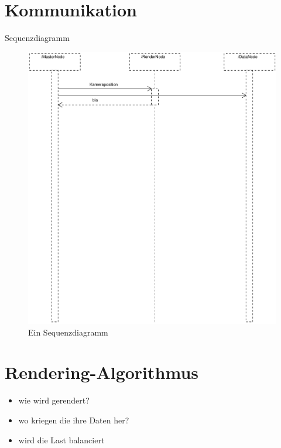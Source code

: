 \section{Kommunikation}
\label{impl:kommunikation}
Sequenzdiagramm
\begin{figure}
 \centering
  \includegraphics[scale=0.5]{images/Sequenzdiagramm.pdf}
  \caption{Ein Sequenzdiagramm}
 \label{fig:seqdiag}
\end{figure}

\begin{center}
\end{center}

\section{Rendering-Algorithmus}
\label{impl:renderalgo}
\begin{itemize}
 \item wie wird gerendert?
 \item wo kriegen die ihre Daten her?
 \item wird die Last balanciert
\end{itemize}


%
%
